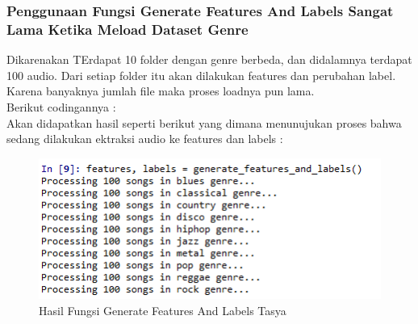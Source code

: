 \begin{enumerate}
\begin{itemize}
\subsubsection{Penggunaan Fungsi Generate Features And Labels Sangat Lama Ketika Meload Dataset Genre}
\par Dikarenakan TErdapat 10 folder dengan genre berbeda, dan didalamnya terdapat 100 audio. Dari setiap folder itu akan dilakukan features dan perubahan label. Karena banyaknya jumlah file maka proses loadnya pun lama.\\
Berikut codingannya :\\

Akan didapatkan hasil seperti berikut yang dimana menunujukan proses bahwa sedang dilakukan ektraksi audio ke features dan labels :
\begin{figure}[ht]
\centering
\includegraphics[scale=0.5]{figures/chapter6tasya11.png}
\caption{Hasil Fungsi Generate Features And Labels Tasya}
\label{Praktek}
\end{figure}


\end{itemize}
\end{enumerate}
